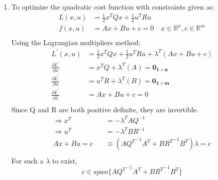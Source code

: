 \begin{enumerate}
  \item To optimize the quadratic cost function with constraints given as:
  \begin{align*}
    L(x,u) &= \frac{1}{2} x^T Q x + \frac{1}{2} u^T R u \\
    f(x,u) &= Ax + Bu + c = 0 \quad x \in \mathbb{R}^n, c \in \mathbb{R}^m\\
  \end{align*}
  Using the Lagrangian multipliers method:
  \begin{align*}
   L^\prime(x,u) &= \frac{1}{2} x^T  Q x + \frac{1}{2} u^T  R u + \lambda^T
(Ax+Bu+c)\\
   \frac{\partial L^\prime}{\partial x} &= x^T  Q  + \lambda^T (A) =
\mathbf{0_{1\times n}}\\
   \frac{\partial L^\prime}{\partial u} &= u^T  R  + \lambda^T (B) =
\mathbf{0_{1\times m}}\\
   \frac{\partial L^\prime}{\partial \lambda} &= Ax + Bu +c = 0 \\
  \end{align*}
  Since Q and R are both positive definite, they are invertible.
  \begin{align*}
   \Rightarrow x^T &= -\lambda^T A  Q^{-1} \\
   \Rightarrow u^T &=  -\lambda^T B  R^{-1}\\
   A x + B u = c  \quad &\equiv \left(A  {Q^T}^{-1} A^T + B {R^T} ^{-1} B^T
\right) \lambda = c\\
  \end{align*}
  For such a $\lambda$ to exist,
  \begin{equation*}
  c \in span\{A {Q^T}^{-1} A^T + B {R^T}^{-1} B^T \}
  \end{equation*}
 

\end{enumerate}
